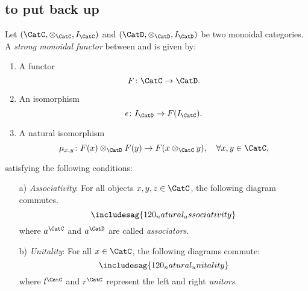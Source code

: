 \subsection{to put back up}


\begin{ctdefinition}
Let $(\CatC,\otimes_\CatC,I_\CatC)$ and $(\CatD,\otimes_\CatD,I_\CatD)$ be two monoidal categories. A \emph{strong monoidal functor} between \CatC and \CatD is given by:
\begin{enumerate}
    \item A functor
    \begin{equation}
        F\colon \CatC\to \CatD.
    \end{equation}
    \item An isomorphism
    \begin{equation}
        \epsilon\colon I_\CatD\to F(I_\CatC).
    \end{equation}
    \item A natural isomorphism
    \begin{equation}
        \mu_{x,y}\colon F(x)\otimes_\CatD F(y) \to F(x\otimes_\CatC y),\quad \forall x,y\in \CatC,
    \end{equation}
\end{enumerate}
satisfying the following conditions:
\begin{enumerate}
    \item[a)] \emph{Associativity}: For all objects $x,y,z\in \CatC$, the following diagram commutes.
    \begin{equation}
        \includesag{120_natural_associativity}
    \end{equation}
    where $a^\CatC$ and $a^\CatD$ are called \emph{associators}.
    \item[b)] \emph{Unitality}: For all $x\in \CatC$, the following diagrams commute:
    \begin{equation}
        \includesag{120_natural_unitality}
    \end{equation}
    where $l^\CatC$ and $r^\CatC$ represent the left and right \emph{unitors}.
\end{enumerate}
\end{ctdefinition}


